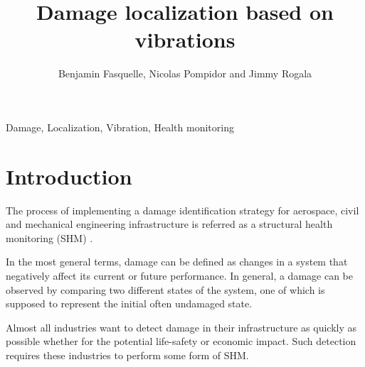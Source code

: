 \documentclass[journal]{IEEEtran}
\begin{document}
%
\title{Damage localization based on vibrations}


\author{Benjamin Fasquelle, Nicolas Pompidor and Jimmy Rogala}

\newtheorem{remark}{Remark}



\maketitle


\begin{abstract}
\end{abstract}

\begin{IEEEkeywords}
Damage, Localization, Vibration, Health monitoring
\end{IEEEkeywords}


\IEEEpeerreviewmaketitle



\section{Introduction}


The process of implementing a damage identification strategy for aerospace,
 civil and mechanical engineering infrastructure is referred as a structural health monitoring (SHM) \cite{farrar2007introduction}.

In the most general terms, damage can be defined as changes in a system that negatively affect its current or future performance. 
In general, a damage can be observed by comparing two different states of the system,
 one of which is supposed to represent the initial often undamaged state.


Almost all industries want to detect damage in their infrastructure as quickly as possible whether 
 for the potential life-safety or economic impact.
Such detection requires these industries to perform some form of SHM.
\end{document}
